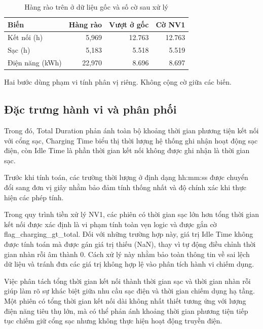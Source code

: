 \documentclass[conference,a4paper]{IEEEtran}
\begin{document}
\begin{table}[!t]
\caption{Hàng rào trên ở dữ liệu gốc và số cờ sau xử lý}
\label{tab:iqr_long}
\centering\footnotesize
\setlength{\tabcolsep}{3pt}
\begin{tabularx}{\columnwidth}{@{}Xrrr@{}}
\toprule
\textbf{Biến} & \textbf{Hàng rào} & \textbf{Vượt ở gốc} & \textbf{Cờ NV1} \\
\midrule
Kết nối (h) & 5,969 & 12.763 & 12.763 \\
Sạc (h) & 5,183 & 5.518 & 5.519 \\
Điện năng (kWh) & 22,970 & 8.696 & 8.697 \\
\bottomrule
\end{tabularx}
\par\smallskip\raggedright\scriptsize Hai bước dùng phạm vi tính phân vị riêng. Không cộng cờ giữa các biến.
\end{table}

\subsection{Đặc trưng hành vi và phân phối}

Trong đó, Total Duration phản ánh toàn bộ khoảng thời gian phương tiện kết nối với cổng sạc, Charging Time biểu thị thời lượng hệ thống ghi nhận hoạt động sạc điện, còn Idle Time là phần thời gian kết nối không được ghi nhận là thời gian sạc.

Trước khi tính toán, các trường thời lượng ở định dạng hh:mm:ss được chuyển đổi sang đơn vị giây nhằm bảo đảm tính thống nhất và độ chính xác khi thực hiện các phép tính.

Trong quy trình tiền xử lý NV1, các phiên có thời gian sạc lớn hơn tổng thời gian kết nối được xác định là vi phạm tính toàn vẹn logic và được gắn cờ flag\_charging\_gt\_total. Đối với những trường hợp này, giá trị Idle Time không được tính toán mà được gán giá trị thiếu (NaN), thay vì tự động điều chỉnh thời gian nhàn rỗi âm thành 0. Cách xử lý này nhằm bảo toàn thông tin về sai lệch dữ liệu và tránh đưa các giá trị không hợp lệ vào phân tích hành vi chiếm dụng.

Việc phân tách tổng thời gian kết nối thành thời gian sạc và thời gian nhàn rỗi giúp làm rõ sự khác biệt giữa nhu cầu sạc điện và thời gian chiếm dụng hạ tầng. Một phiên có tổng thời gian kết nối dài không nhất thiết tương ứng với lượng điện năng tiêu thụ lớn, mà có thể phản ánh khoảng thời gian phương tiện tiếp tục chiếm giữ cổng sạc nhưng không thực hiện hoạt động truyền điện.
\end{document}
